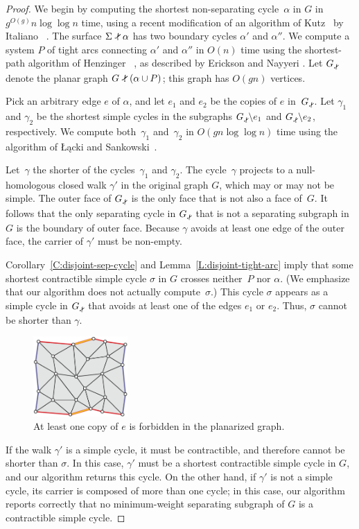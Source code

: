 \documentclass[twoside,leqno,twocolumn]{article}
\def\snip{\mathbin{\raisebox{0.15ex}{\rotatebox[origin=c]{60}{\Rightscissors}\!}}}
\def\subsnip{\mathbin{\raisebox{0.15ex}{\rotatebox[origin=c]{60}{\footnotesize\Rightscissors}\!}}}
\def\Gsnip{\mathord{G_{\subsnip}}}
\begin{document}
\begin{proof}
We begin by computing the shortest non-separating cycle~$\alpha$ in $G$ in $g^{O(g)}n \log \log n$ time, using a recent modification of an algorithm of Kutz~\cite{k-csnco-06} by Italiano \etal~\cite{insw-iamcmf-11}.  The surface $\Sigma \snip \alpha$ has two boundary cycles $\alpha'$ and $\alpha''$.  We compute a system $P$ of tight arcs connecting $\alpha'$ and $\alpha''$ in $O(n)$ time using the shortest-path algorithm of Henzinger \etal~\cite{hkrs-fspap-97}, as described by Erickson and Nayyeri \cite{en-mcsnc-11}.  Let $\Gsnip$ denote the planar graph $G \snip (\alpha \cup P)$; this graph has $O(gn)$ vertices.

Pick an arbitrary edge $e$ of $\alpha$, and let $e_1$ and $e_2$ be the copies of $e$ in~$\Gsnip$.  Let $\gamma_1$ and $\gamma_2$ be the shortest simple cycles in the  subgraphs $\Gsnip \backslash e_1$ and $\Gsnip \backslash e_2$, respectively.  We  compute both~$\gamma_1$ and~$\gamma_2$ in $O(gn \log\log n)$ time using the algorithm of Łącki and Sankowski~\cite{ls-mcsc-11}.

Let~$\gamma$ the shorter of the cycles~$\gamma_1$ and $\gamma_2$.  The cycle~$\gamma$ projects to a null-homologous closed walk $\gamma'$ in the original graph $G$, which may or may not be simple.  The outer face of $\Gsnip$ is the only face that is not also a face of~$G$.  It follows that the only separating cycle in $\Gsnip$ that is not a separating subgraph in $G$ is the boundary of outer face.  Because $\gamma$ avoids at least one edge of the outer face, the carrier of $\gamma'$ must be non-empty.

Corollary~\ref{C:disjoint-sep-cycle} and Lemma~\ref{L:disjoint-tight-arc} imply that some shortest contractible simple cycle $\sigma$ in $G$ crosses neither~$P$ nor $\alpha$.  (We emphasize that our algorithm does not actually compute~$\sigma$.)  This cycle $\sigma$ appears as a simple cycle in $\Gsnip$ that avoids at least one of the edges $e_1$ or $e_2$.  Thus, $\sigma$ cannot be shorter than $\gamma$.  

\begin{figure}[ht]
\centering
\includegraphics[height=1.2in]{Fig/forbidden-pair}
\caption{At least one copy of $e$ is forbidden in the planarized graph.}
\label{F:forbidden-pair}
\end{figure}

If the walk $\gamma'$ is a simple cycle, it must be contractible, and therefore cannot be shorter than $\sigma$.  In this case, $\gamma'$ must be a shortest contractible simple cycle in $G$, and our algorithm returns this cycle.  On the other hand, if $\gamma'$ is not a simple cycle, its carrier is composed of more than one cycle; in this case, our algorithm reports correctly that no minimum-weight separating subgraph of $G$ is a contractible simple cycle.
\end{proof}
\end{document}
